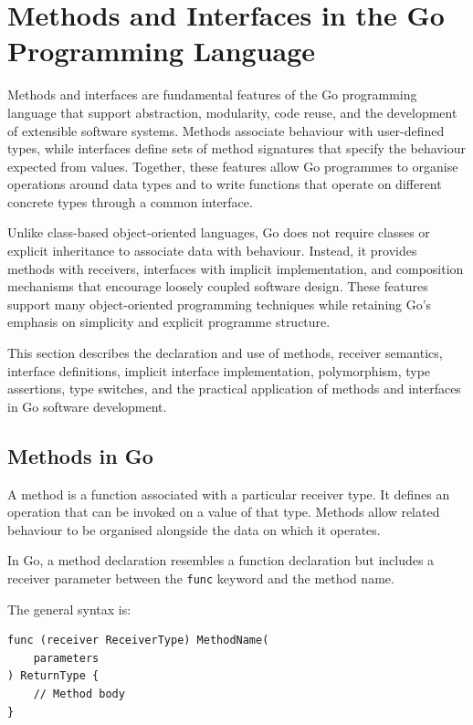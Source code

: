 \section{Methods and Interfaces in the Go Programming Language}

Methods and interfaces are fundamental features of the Go programming language that support abstraction, modularity, code reuse, and the development of extensible software systems. Methods associate behaviour with user-defined types, while interfaces define sets of method signatures that specify the behaviour expected from values. Together, these features allow Go programmes to organise operations around data types and to write functions that operate on different concrete types through a common interface.

Unlike class-based object-oriented languages, Go does not require classes or explicit inheritance to associate data with behaviour. Instead, it provides methods with receivers, interfaces with implicit implementation, and composition mechanisms that encourage loosely coupled software design. These features support many object-oriented programming techniques while retaining Go's emphasis on simplicity and explicit programme structure.

This section describes the declaration and use of methods, receiver semantics, interface definitions, implicit interface implementation, polymorphism, type assertions, type switches, and the practical application of methods and interfaces in Go software development.

\subsection{Methods in Go}

A method is a function associated with a particular receiver type. It defines an operation that can be invoked on a value of that type. Methods allow related behaviour to be organised alongside the data on which it operates.

In Go, a method declaration resembles a function declaration but includes a receiver parameter between the \texttt{func} keyword and the method name.

The general syntax is:

\begin{lstlisting}
func (receiver ReceiverType) MethodName(
    parameters
) ReturnType {
    // Method body
}
\end{lstlisting}

